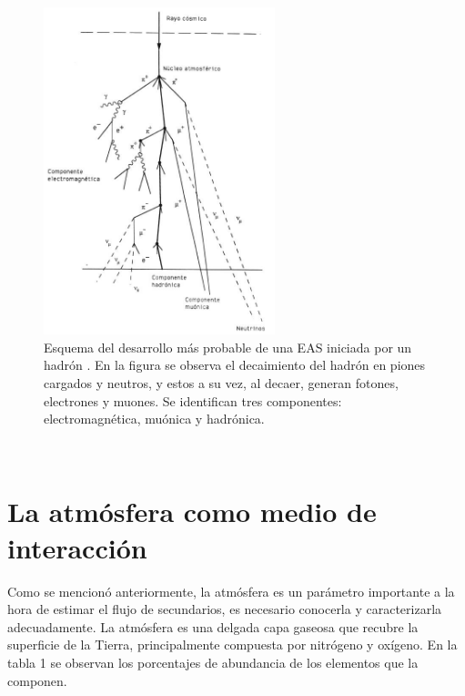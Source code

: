 \begin{figure}[htb!]
    \begin{center}
        \includegraphics[width=0.6\textwidth]{Figs/componentes_cas.jpg}
    \end{center}{}
    \caption[Esquema del desarrollo de una EAS iniciada por un hadrón.]{Esquema del desarrollo más probable de una EAS iniciada por un hadrón \parencite{mauro:tesis}. En la figura se observa el decaimiento del hadrón en piones cargados y neutros, y estos a su vez, al decaer, generan fotones, electrones y muones. Se identifican tres componentes: electromagnética, muónica y hadrónica.}
    \label{fig:fig3}
\end{figure}\\
\section{La atmósfera como medio de interacción}

Como se mencionó anteriormente, la atmósfera es un parámetro importante a la hora de estimar el flujo de secundarios, es necesario conocerla y caracterizarla adecuadamente. La atmósfera es una delgada capa gaseosa que recubre la superficie de la Tierra, principalmente compuesta por nitrógeno y oxígeno. En la tabla 1 se observan los porcentajes de abundancia de los elementos que la componen. \\


